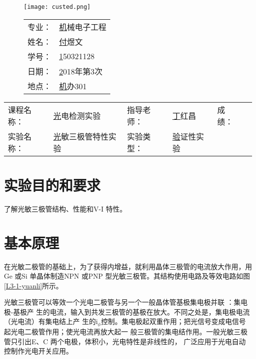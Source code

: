 \documentclass{zjureport}
\makeatletter
\newcommand\dlmu[2][4cm]{\hskip1pt\underline{\hb@xt@ #1{\hss#2\hss}}\hskip3pt}
\newcommand{\major}{机械电子工程}
\newcommand{\name}{付煜文}
\newcommand{\stuid}{150321128}
\newcommand{\newdate}{2018年第3次}
\newcommand{\loc}{机办301}
\newcommand{\course}{光电检测实验}
\newcommand{\tutor}{丁红昌}
\newcommand{\newtitle}{光敏三极管特性实验}
\newcommand{\exptype}{验证性实验}
\makeatother
\begin{document}
		\thispagestyle{plain}         %
	\begin{figure}[h]
		\begin{minipage}{0.6\linewidth}
			\centerline{\texttt{[image: custed.png]}}
		\end{minipage}
		\hfill
		\begin{minipage}{.4\linewidth}
			\raggedleft
			\begin{tabular*}{.8\linewidth}{ll}
				专业： & \underline\major   \\
				姓名： & \underline\name    \\
				学号： & \underline\stuid   \\
				日期： & \underline\newdate \\
				地点： & \underline\loc
			\end{tabular*}
		\end{minipage}
	\end{figure}
	
	\begin{table}[!htbp]
		\centering
		\begin{tabular*}{\linewidth}{llllll}
			课程名称： & \underline\course   & 指导老师： & \underline\tutor   & 成绩：       &  \dlmu[1.5cm]{} \\
			实验名称： & \underline\newtitle & 实验类型： & \underline\exptype 
		\end{tabular*}
	\end{table}


\section{实验目的和要求}
	{了解光敏三极管结构、性能和V-I 特性。}
\section{基本原理}
	{
		在光敏二极管的基础上，为了获得内增益，就利用晶体三极管的电流放大作用，用Ge 或Si
		单晶体制造NPN 或PNP 型光敏三极管。其结构使用电路及等效电路如图\ref{L3-1-yuanli}所示。}
	
		
	{光敏三极管可以等效一个光电二极管与另一个一般晶体管基极集电极并联 ：集电极-基极产
		生的电流，输入到共发三极管的基极在放大。不同之处是，集电极电流（光电流）有集电结上产
		生的i$_{\phi}$控制。集电极起双重作用；把光信号变成电信号起光电二极管作用；使光电流再放大起一
		般三极管的集电结作用。一般光敏三极管只引出E、C 两个电极，体积小，光电特性是非线性的，
		广泛应用于光电自动控制作光电开关应用。}	
	
\end{document}
